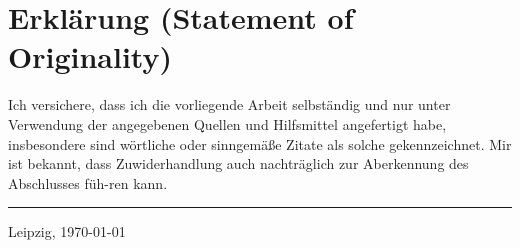 \section*{Erklärung (Statement of Originality)}\label{erklaerung}

Ich versichere, dass ich die vorliegende Arbeit selbständig und nur
unter Verwendung der angegebenen Quellen und Hilfsmittel angefertigt
habe, insbesondere sind wörtliche oder sinngemäße Zitate als solche
gekennzeichnet. Mir ist bekannt, dass Zuwiderhandlung auch nachträglich
zur Aberkennung des Abschlusses füh-ren kann.\vspace{3em}

\rule{.35\textwidth}{0.4pt}\quad{}Leipzig, \germanDate{}\today{}
